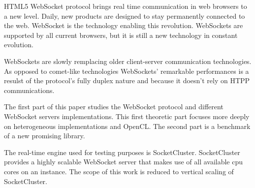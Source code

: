 HTML5 WebSocket protocol brings real time communication in web browsers to a
new level. Daily, new products are designed to stay permanently connected to
the web. WebSocket is the technology enabling this revolution. WebSockets are
supported by all current browsers, but it is still a new technology in constant
evolution.

WebSockets are slowly remplacing older client-server communication
technologies. As opposed to comet-like technologies WebSockets' remarkable
performances is a resulst of the protocol's fully duplex nature and because it
doesn't rely on HTPP communications.

The first part of this paper studies the WebSocket protocol and different 
WebSocket servers implementations. This first theoretic part focuses more 
deeply on heterogeneous implementations and OpenCL. The second part is
a benchmark of a new promising library. 

The real-time engine used for testing purposes is SocketCluster. SocketCluster
provides a highly scalable WebSocket server that makes use of all available cpu
cores on an instance. The scope of this work is reduced to vertical scaling of 
SocketCluster.



